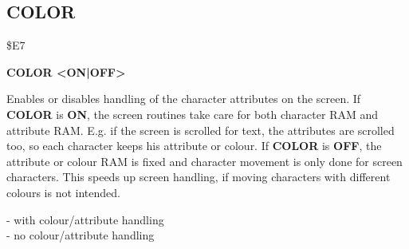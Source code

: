 
\newpage
\subsection{COLOR}
\begin{description}[leftmargin=2cm,style=nextline]
\item [Token:] \$E7
\item [Format:] {\bf COLOR <ON|OFF>}
\item [Usage:] Enables or disables
               handling of the character attributes on the screen.
               If {\bf COLOR} is {\bf ON}, the screen routines
               take care for both character RAM and attribute RAM.
               E.g. if the screen is scrolled for text, the attributes
               are scrolled too, so each character keeps his attribute
               or colour. If {\bf COLOR} is {\bf OFF}, the attribute
               or colour RAM is fixed and character movement is only
               done for screen characters. This speeds up screen
               handling, if moving characters with different colours is
               not intended.
\item [Example:]  - with colour/attribute handling \\
                  - no colour/attribute handling

\end{description}


\newpage
